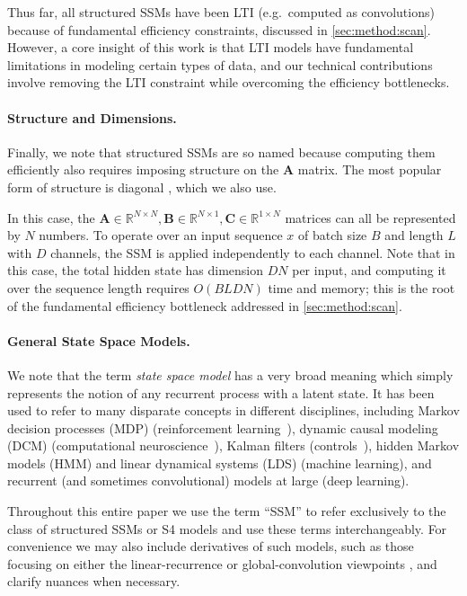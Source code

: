 Thus far, all structured SSMs have been LTI (e.g.\ computed as convolutions) because of fundamental efficiency constraints, discussed in \ref{sec:method:scan}.
However, a core insight of this work is that LTI models have fundamental limitations in modeling certain types of data, and our technical contributions involve removing the LTI constraint while overcoming the efficiency bottlenecks.

\paragraph{Structure and Dimensions.} Finally, we note that structured SSMs are so named because computing them efficiently also requires imposing structure on the $\bm{A}$ matrix. The most popular form of structure is diagonal \citep{gupta2022diagonal,gu2022parameterization,smith2023s5}, which we also use.

In this case, the $\bm{A} \in \mathbb{R}^{N \times N}, \bm{B} \in \mathbb{R}^{N \times 1}, \bm{C} \in \mathbb{R}^{1 \times N}$ matrices can all be represented by $N$ numbers. To operate over an input sequence $x$ of batch size $B$ and length $L$ with $D$ channels, the SSM is applied independently to each channel. Note that in this case, the total hidden state has dimension $DN$ per input, and computing it over the sequence length requires $O(BLDN)$ time and memory; this is the root of the fundamental efficiency bottleneck addressed in \ref{sec:method:scan}.

\paragraph{General State Space Models.} We note that the term \emph{state space model} has a very broad meaning which simply represents the notion of any recurrent process with a latent state. It has been used to refer to many disparate concepts in different disciplines, including Markov decision processes (MDP) (reinforcement learning~\citep{hafner2020dream}),
dynamic causal modeling (DCM) (computational neuroscience~\citep{friston2003dynamic}),
Kalman filters (controls~\citep{kalman1960new}),
hidden Markov models (HMM) and linear dynamical systems (LDS) (machine learning), and recurrent (and sometimes convolutional) models at large (deep learning).

Throughout this entire paper we use the term ``SSM'' to refer exclusively to the class of structured SSMs or S4 models \citep{gu2022efficiently,gupta2022diagonal,gu2022parameterization,ma2023mega,smith2023s5,hasani2023liquid} and use these terms interchangeably. For convenience we may also include derivatives of such models, such as those focusing on either the linear-recurrence or global-convolution viewpoints \citep{orvieto2023resurrecting,li2023makes,poli2023hyena}, and clarify nuances when necessary.

